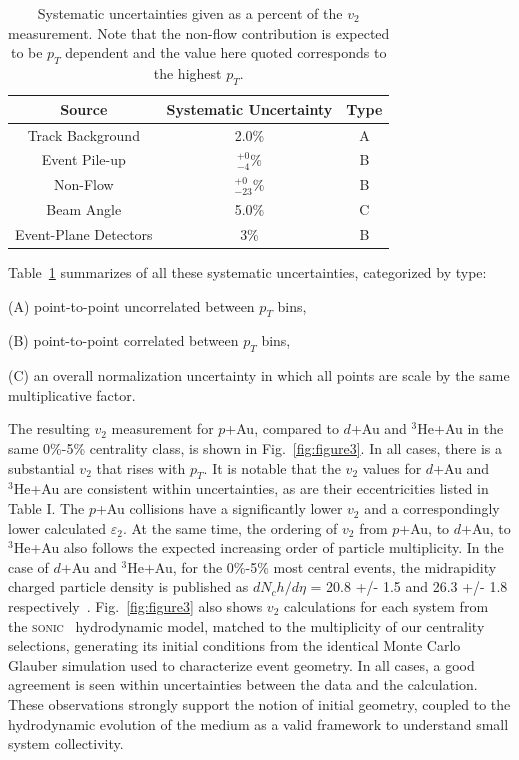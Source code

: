 \documentclass[%
reprint,
showpacs,preprintnumbers,
 amsmath,amssymb,
 aps,
]{revtex4-1}
\newcommand{\pt}{\mbox{$p_T$}\xspace}
\newcommand{\dau}{\mbox{$d$+Au}\xspace}
\newcommand{\pau}{\mbox{$p$+Au}\xspace}
\newcommand{\hau}{\mbox{$^3\text{He}$+Au}\xspace}
\begin{document}
\label{s:sys}
\begin{table}[htbp]
  \begin{center}
    \begin{tabular}{ccc}
      \hline
      \hline
      Source& Systematic Uncertainty & Type \\ \hline
      Track Background &2.0\%& A\\ 
      Event Pile-up    &$^{+0}_{-4}\%$& B\\
      Non-Flow    &$^{+0}_{-23}\%$& B\\
      Beam Angle &5.0\%& C\\  
      Event-Plane Detectors & 3\% & B\\
    \hline
    \hline
    \end{tabular}
   \caption{\label{t:sys}Systematic uncertainties given as a percent of the $v_2$ measurement. Note that the non-flow contribution is expected to be \pt dependent and the value here quoted corresponds to the highest \pt.}
   \end{center}
 \end{table}

Table~\ref{t:sys} summarizes of all these systematic
uncertainties, categorized by type:

(A) point-to-point uncorrelated between $p_T$ bins,

(B) point-to-point correlated between $p_T$ bins,

(C) an overall normalization uncertainty in which all points are scale by the same multiplicative factor.

The resulting $v_2$ measurement for \pau, compared to \dau and \hau in the same 0\%-5\% centrality class, is shown in Fig.~\ref{fig:figure3}. In all cases, there is a substantial $v_2$ that rises with \pt. It is notable that the $v_2$ values for \dau and \hau are consistent within uncertainties, as are their eccentricities listed in Table I. The \pau collisions have a significantly lower $v_2$ and a correspondingly lower calculated $\varepsilon_2$. At the same time, the ordering of $v_2$ from \pau, to \dau, to \hau also follows the expected increasing order of particle multiplicity. In the case of \dau and \hau, for the 0\%-5\% most central events, the midrapidity charged particle density is published as $dN_ch/d\eta$ = 20.8 +/- 1.5 and 26.3 +/- 1.8 respectively~\cite{Adare:2015bua}. Fig.~\ref{fig:figure3} also shows $v_2$ calculations for each system from the \textsc{sonic}~\cite{Habich:2014jna} hydrodynamic model, matched to the multiplicity of our centrality selections, generating its initial conditions from the identical Monte Carlo Glauber simulation used to characterize event geometry. In all cases, a good agreement is seen within uncertainties between the data and the calculation. These observations strongly support the notion of initial geometry, coupled to the hydrodynamic evolution of the medium as a valid framework to understand small system collectivity.
\end{document}
